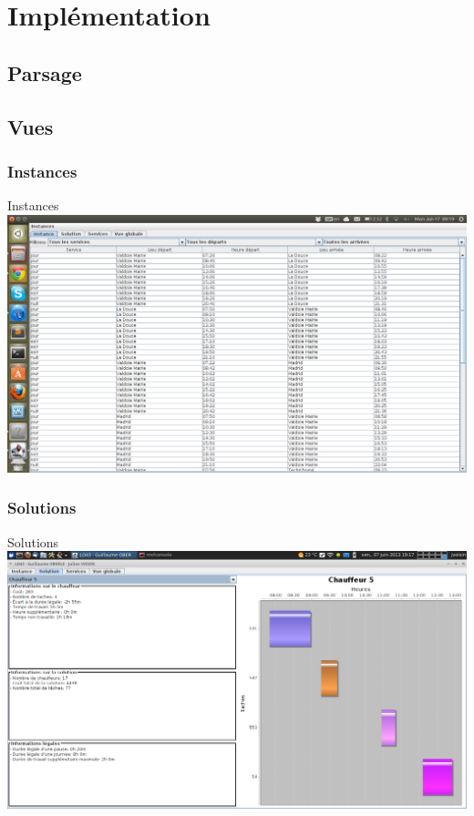 \documentclass[xcolor=x11names,12pt,compress]{beamer}
\begin{document}
\section{Implémentation}
\subsection{Parsage}
\subsection{Vues}
\subsubsection{Instances}
\begin{frame}{Instances}
    \includegraphics[width=\textwidth]{../rapport/instances.png}
\end{frame}
\subsubsection{Solutions}
\begin{frame}{Solutions}
    \includegraphics[width=\textwidth]{../rapport/chauffeur.png}
\end{frame}
\end{document}

